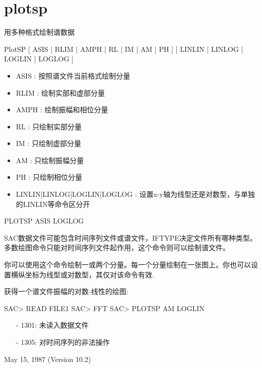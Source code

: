 \section{plotsp}
\label{cmd:plotsp}

用多种格式绘制谱数据

PlotSP [ ASIS | RLIM | AMPH | RL | IM | AM | PH ] [ LINLIN | LINLOG | LOGLIN | LOGLOG ]

\begin{itemize}
\item ASIS :  按照谱文件当前格式绘制分量
\item RLIM :  绘制实部和虚部分量 
\item AMPH :  绘制振幅和相位分量 
\item RL :  只绘制实部分量 
\item IM :  只绘制虚部分量 
\item AM :  只绘制振幅分量 
\item PH :  只绘制相位分量 
\item LINLIN|LINLOG|LOGLIN|LOGLOG : 设置x-y轴为线型还是对数型，与单独的LINLIN等命令区分开
\end{itemize}

PLOTSP ASIS LOGLOG

SAC数据文件可能包含时间序列文件或谱文件，IFTYPE决定文件所有哪种类型。多数绘图命令只能对时间序列文件起作用，这个命令则可以绘制谱文件。

你可以使用这个命令绘制一或两个分量。每一个分量绘制在一张图上。你也可以设置横纵坐标为线型或对数型，其仅对该命令有效.

获得一个谱文件振幅的对数-线性的绘图:
\begin{SACCode}
SAC> READ FILE1
SAC> FFT
SAC> PLOTSP AM LOGLIN
\end{SACCode}

\begin{itemize}
\item[-]1301: 未读入数据文件
\item[-]1305: 对时间序列的非法操作
\end{itemize}

May 15, 1987 (Version 10.2)
